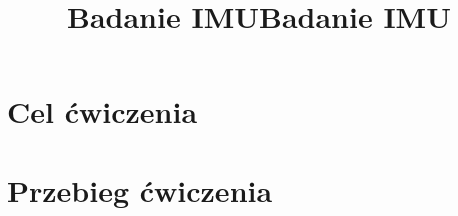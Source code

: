 \documentclass[theme = light]{sprawozdanie}
\title{Badanie IMU}
\author{ }
\begin{document}
\maketitle
%
\title{Badanie IMU}
%
%
\tableofcontents\hfill\vfill
%


%
\vfill

%
%
\newpage
\section{Cel ćwiczenia} \label{sec:podstawy}
    
%     
%     
\newpage
\section{Przebieg ćwiczenia}
    
    
\newpage
    
%
\end{document}
